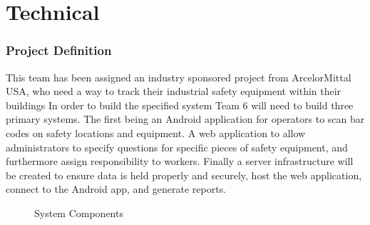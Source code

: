 \documentclass[Letter,11pt]{article}
\begin{document}
\part{Technical}
\section{Project Definition}\label{def}
	This team has been assigned an industry sponsored project from ArcelorMittal USA, who need a way to track their industrial safety equipment within their buildings In order to build the specified system Team 6 will need to build three primary systems. The first being an Android application for operators to scan bar codes on safety locations and equipment. A web application to allow administrators to specify questions for specific pieces of safety equipment, and furthermore assign responsibility to workers. Finally a server infrastructure will be created to ensure data is held properly and securely, host the web application, connect to the Android app, and generate reports. 
			
	\begin{figure}[h]
		\centering
		
		\caption{\label{sysConn} System Components}
	\end{figure}
	
\end{document}
